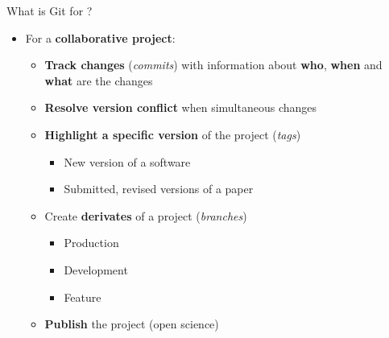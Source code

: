 \documentclass[10pt]{beamer}
\begin{document}
\begin{frame}{What is Git for ?}
\protect\hypertarget{what-is-git-for-1}{}
\begin{itemize}
\item
  For a \textbf{collaborative project}:
  \begin{itemize}
  \item
    \textbf{Track changes} (\emph{commits}) with information about
    \textbf{who}, \textbf{when} and \textbf{what} are the changes
  \item
    \textbf{Resolve version conflict} when simultaneous changes
 \item
    \textbf{Highlight a specific version} of the project (\emph{tags})
    \begin{itemize}
    \item
      New version of a software
    \item
      Submitted, revised versions of a paper
    \end{itemize}
    \item
        Create \textbf{derivates} of a project (\emph{branches})
        \begin{itemize}
            \item Production
            \item Development
            \item Feature
        \end{itemize}
  \item
    \textbf{Publish} the project (open science)
  \end{itemize}
\end{itemize}
\end{frame}
\end{document}
